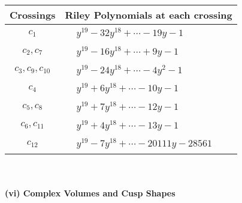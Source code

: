 \documentclass[1p]{elsarticle_modified}
\theoremstyle{definition}
\begin{document}
\begin{tabular}{m{50pt}|m{274pt}}
Crossings & \hspace{64pt}Riley Polynomials at each crossing \\
\hline $$\begin{aligned}c_{1}\end{aligned}$$&$\begin{aligned}
&y^{19}-32 y^{18}+\cdots-19 y-1
\end{aligned}$\\
\hline $$\begin{aligned}c_{2},c_{7}\end{aligned}$$&$\begin{aligned}
&y^{19}-16 y^{18}+\cdots+9 y-1
\end{aligned}$\\
\hline $$\begin{aligned}c_{3},c_{9},c_{10}\end{aligned}$$&$\begin{aligned}
&y^{19}-24 y^{18}+\cdots-4 y^2-1
\end{aligned}$\\
\hline $$\begin{aligned}c_{4}\end{aligned}$$&$\begin{aligned}
&y^{19}+6 y^{18}+\cdots-10 y-1
\end{aligned}$\\
\hline $$\begin{aligned}c_{5},c_{8}\end{aligned}$$&$\begin{aligned}
&y^{19}+7 y^{18}+\cdots-12 y-1
\end{aligned}$\\
\hline $$\begin{aligned}c_{6},c_{11}\end{aligned}$$&$\begin{aligned}
&y^{19}+4 y^{18}+\cdots-13 y-1
\end{aligned}$\\
\hline $$\begin{aligned}c_{12}\end{aligned}$$&$\begin{aligned}
&y^{19}-7 y^{18}+\cdots-20111 y-28561
\end{aligned}$\\
\hline
\end{tabular}\\~\\
\newpage\flushleft \textbf{(vi) Complex Volumes and Cusp Shapes}
\end{document}
